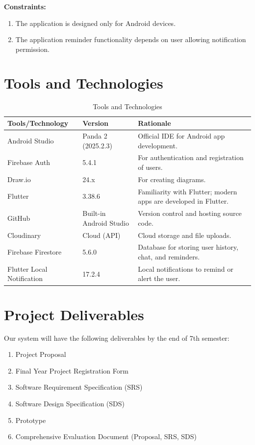 \documentclass[12pt, a4paper, oneside]{report}
\begin{document}
\textbf{Constraints:}
\begin{enumerate}
    \item The application is designed only for Android devices.
    \item The application reminder functionality depends on user allowing notification permission.
\end{enumerate}

\section{Tools and Technologies}
\label{sec:tools}

\begin{table}[H]
\centering
\caption{Tools and Technologies}
\label{tab:tools}
\begin{tabularx}{\textwidth}{|l|l|X|}
\hline
\textbf{Tools/Technology} & \textbf{Version} & \textbf{Rationale} \\ \hline
Android Studio & Panda 2 (2025.2.3) & Official IDE for Android app development. \\ \hline
Firebase Auth & 5.4.1 & For authentication and registration of users. \\ \hline
Draw.io & 24.x & For creating diagrams. \\ \hline
Flutter & 3.38.6 & Familiarity with Flutter; modern apps are developed in Flutter. \\ \hline
GitHub & Built-in Android Studio & Version control and hosting source code. \\ \hline
Cloudinary & Cloud (API) & Cloud storage and file uploads. \\ \hline
Firebase Firestore & 5.6.0 & Database for storing user history, chat, and reminders. \\ \hline
Flutter Local Notification & 17.2.4 & Local notifications to remind or alert the user. \\ \hline
\end{tabularx}
\end{table}

\section{Project Deliverables}
\label{sec:deliverables}

Our system will have the following deliverables by the end of 7th semester:
\begin{enumerate}
    \item Project Proposal
    \item Final Year Project Registration Form
    \item Software Requirement Specification (SRS)
    \item Software Design Specification (SDS)
    \item Prototype
    \item Comprehensive Evaluation Document (Proposal, SRS, SDS)
\end{enumerate}
\end{document}
